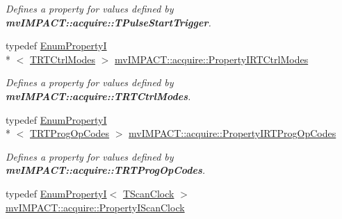 \begin{DoxyCompactItemize}
\begin{DoxyCompactList}\small\item\em Defines a property for values defined by {\bfseries mv\+I\+M\+P\+A\+C\+T\+::acquire\+::\+T\+Pulse\+Start\+Trigger}. \end{DoxyCompactList}\item 
\hypertarget{group___device_specific_interface_gae76ca31bc5381777584ad1431182d5d4}{typedef \hyperlink{classmv_i_m_p_a_c_t_1_1acquire_1_1_enum_property_i}{Enum\+Property\+I}\\*
$<$ \hyperlink{group___device_specific_interface_gaa8cbd8960bf75617dcd943de055a7a14}{T\+R\+T\+Ctrl\+Modes} $>$ \hyperlink{group___device_specific_interface_gae76ca31bc5381777584ad1431182d5d4}{mv\+I\+M\+P\+A\+C\+T\+::acquire\+::\+Property\+I\+R\+T\+Ctrl\+Modes}}\label{group___device_specific_interface_gae76ca31bc5381777584ad1431182d5d4}

\begin{DoxyCompactList}\small\item\em Defines a property for values defined by {\bfseries mv\+I\+M\+P\+A\+C\+T\+::acquire\+::\+T\+R\+T\+Ctrl\+Modes}. \end{DoxyCompactList}\item 
\hypertarget{group___device_specific_interface_gaa22518faa79c768c8c1cbf763bc0dec7}{typedef \hyperlink{classmv_i_m_p_a_c_t_1_1acquire_1_1_enum_property_i}{Enum\+Property\+I}\\*
$<$ \hyperlink{group___device_specific_interface_ga5033b37abac54ed7ef556cf2ad7b1152}{T\+R\+T\+Prog\+Op\+Codes} $>$ \hyperlink{group___device_specific_interface_gaa22518faa79c768c8c1cbf763bc0dec7}{mv\+I\+M\+P\+A\+C\+T\+::acquire\+::\+Property\+I\+R\+T\+Prog\+Op\+Codes}}\label{group___device_specific_interface_gaa22518faa79c768c8c1cbf763bc0dec7}

\begin{DoxyCompactList}\small\item\em Defines a property for values defined by {\bfseries mv\+I\+M\+P\+A\+C\+T\+::acquire\+::\+T\+R\+T\+Prog\+Op\+Codes}. \end{DoxyCompactList}\item 
\hypertarget{group___device_specific_interface_ga873cba8b9f282d5d983d2be1c8d3dcaa}{typedef \hyperlink{classmv_i_m_p_a_c_t_1_1acquire_1_1_enum_property_i}{Enum\+Property\+I}$<$ \hyperlink{group___device_specific_interface_gaeb51ae9af79746e86fa53a85691fd043}{T\+Scan\+Clock} $>$ \hyperlink{group___device_specific_interface_ga873cba8b9f282d5d983d2be1c8d3dcaa}{mv\+I\+M\+P\+A\+C\+T\+::acquire\+::\+Property\+I\+Scan\+Clock}}\label{group___device_specific_interface_ga873cba8b9f282d5d983d2be1c8d3dcaa}


\end{DoxyCompactItemize}
